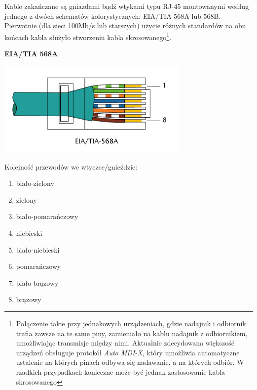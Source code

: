 Kable zakańczane są gniazdami bądź wtykami typu RJ-45 montowanymi według jednego z dwóch schematów kolorystycznych: EIA/TIA 568A lub 568B.
Pierwotnie (dla sieci 100Mb/s lub starszych) użycie różnych standardów na obu końcach kabla służyło stworzeniu kabla skrosowanego\footnote{Połączenie takie przy jednakowych urządzeniach, gdzie nadajnik i odbiornik trafia zawsze na te same piny, zamieniało na kablu nadajnik z odbiornikiem, umożliwiając transmisje między nimi. Aktualnie zdecydowana większość urządzeń obsługuje protokół \emph{Auto MDI-X}, który umożliwia automatyczne ustalenie na których pinach odbywa się nadawanie, a na których odbiór. W rzadkich przypadkach konieczne może być jednak zastosowanie kabla skrosowanego}.

\vspace{0.3cm}\noindent
\begin{minipage}{0.47\textwidth}
\begin{center}
{\noindent\large\bfseries EIA/TIA 568A}

{\noindent\includegraphics[width=0.7\textwidth,clip=true,trim={0, 4.5mm, 0, 0}]{RJ-45_TIA-568A_Right.png}}
\end{center}
\vspace{-0.3cm}

Kolejność przewodów we wtyczce/gnieździe:
\begin{enumerate}
	\item biało-zielony
	\item zielony
	\item biało-pomarańczowy
	\item niebieski
	\item biało-niebieski
	\item pomarańczowy
	\item biało-brązowy
	\item brązowy
\end{enumerate}
\end{minipage}
\hfill

